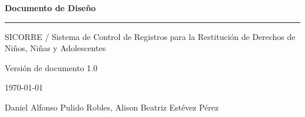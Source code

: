 \documentclass[12pt, letterpaper]{report}
\begin{document}
	
	\begin{titlepage}
		\centering
		\vspace*{2cm}
		{\Huge\bfseries\color{azulDoc} Documento de Diseño\par}
		\vspace{1cm}
		\rule{\linewidth}{1pt}
		\vspace{1cm}
		{\large SICORRE / Sistema de Control de Registros para la
			Restitución de Derechos de Niños, Niñas y 
			Adolescentes\par}
		\vspace{2cm}
		{\large Versión de documento  1.0\par}
		\vspace{1cm}
		{\large \today\par}
		\vfill
		{\normalsize Daniel Alfonso Pulido Robles, Alison Beatriz Estévez Pérez\par}
	\end{titlepage}
	
	\tableofcontents
	\clearpage
	
	
	
	
	
	
	
	
	
	
	
\end{document}
